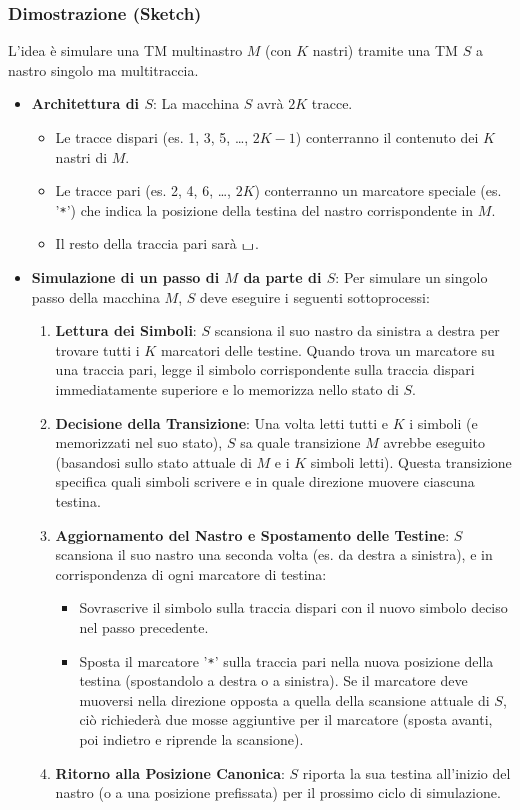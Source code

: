 \documentclass[a4paper]{article}
\theoremstyle{definition} %
\newcommand{\blankS}{\ensuremath{\raisebox{-0.15ex}{\scalebox{1.3}[0.7]{$\sqcup$}}}}
\begin{document}
\subsubsection{Dimostrazione (Sketch)}
L'idea è simulare una TM multinastro $M$ (con $K$ nastri) tramite una TM $S$ a nastro singolo ma multitraccia.
\begin{itemize}
    \item \textbf{Architettura di $S$}: La macchina $S$ avrà $2K$ tracce.
        \begin{itemize}
            \item Le tracce dispari (es. 1, 3, 5, \dots, $2K-1$) conterranno il contenuto dei $K$ nastri di $M$.
            \item Le tracce pari (es. 2, 4, 6, \dots, $2K$) conterranno un marcatore speciale (es. '\texttt{*}') che indica la posizione della testina del nastro corrispondente in $M$.
            \item Il resto della traccia pari sarà $\blankS$.
        \end{itemize}
    \item \textbf{Simulazione di un passo di $M$ da parte di $S$}: Per simulare un singolo passo della macchina $M$, $S$ deve eseguire i seguenti sottoprocessi:
        \begin{enumerate}
            \item \textbf{Lettura dei Simboli}: $S$ scansiona il suo nastro da sinistra a destra per trovare tutti i $K$ marcatori delle testine. Quando trova un marcatore su una traccia pari, legge il simbolo corrispondente sulla traccia dispari immediatamente superiore e lo memorizza nello stato di $S$.
            \item \textbf{Decisione della Transizione}: Una volta letti tutti e $K$ i simboli (e memorizzati nel suo stato), $S$ sa quale transizione $M$ avrebbe eseguito (basandosi sullo stato attuale di $M$ e i $K$ simboli letti). Questa transizione specifica quali simboli scrivere e in quale direzione muovere ciascuna testina.
            \item \textbf{Aggiornamento del Nastro e Spostamento delle Testine}: $S$ scansiona il suo nastro una seconda volta (es. da destra a sinistra), e in corrispondenza di ogni marcatore di testina:
                \begin{itemize}
                    \item Sovrascrive il simbolo sulla traccia dispari con il nuovo simbolo deciso nel passo precedente.
                    \item Sposta il marcatore '\texttt{*}' sulla traccia pari nella nuova posizione della testina (spostandolo a destra o a sinistra). Se il marcatore deve muoversi nella direzione opposta a quella della scansione attuale di $S$, ciò richiederà due mosse aggiuntive per il marcatore (sposta avanti, poi indietro e riprende la scansione).
                \end{itemize}
            \item \textbf{Ritorno alla Posizione Canonica}: $S$ riporta la sua testina all'inizio del nastro (o a una posizione prefissata) per il prossimo ciclo di simulazione.
        \end{enumerate}
\end{itemize}
\end{document}

